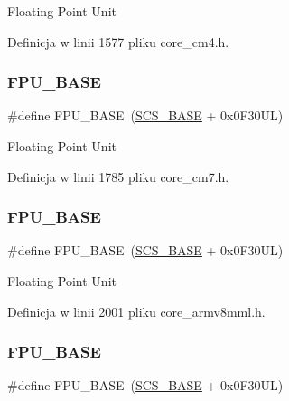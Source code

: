 Floating Point Unit 

Definicja w linii 1577 pliku core\+\_\+cm4.\+h.

\mbox{\label{group___c_m_s_i_s__core__base_ga4dcad4027118c098c07bcd575f1fbb28}} 
\subsubsection{\texorpdfstring{F\+P\+U\+\_\+\+B\+A\+SE}{FPU\_BASE}\hspace{0.1cm}{\footnotesize\ttfamily [2/4]}}
{\footnotesize\ttfamily \#define F\+P\+U\+\_\+\+B\+A\+SE~(\hyperlink{group___c_m_s_i_s__core__base_ga3c14ed93192c8d9143322bbf77ebf770}{S\+C\+S\+\_\+\+B\+A\+SE} +  0x0\+F30\+U\+L)}

Floating Point Unit 

Definicja w linii 1785 pliku core\+\_\+cm7.\+h.

\mbox{\label{group___c_m_s_i_s__core__base_ga4dcad4027118c098c07bcd575f1fbb28}} 
\subsubsection{\texorpdfstring{F\+P\+U\+\_\+\+B\+A\+SE}{FPU\_BASE}\hspace{0.1cm}{\footnotesize\ttfamily [3/4]}}
{\footnotesize\ttfamily \#define F\+P\+U\+\_\+\+B\+A\+SE~(\hyperlink{group___c_m_s_i_s__core__base_ga3c14ed93192c8d9143322bbf77ebf770}{S\+C\+S\+\_\+\+B\+A\+SE} +  0x0\+F30\+U\+L)}

Floating Point Unit 

Definicja w linii 2001 pliku core\+\_\+armv8mml.\+h.

\mbox{\label{group___c_m_s_i_s__core__base_ga4dcad4027118c098c07bcd575f1fbb28}} 
\subsubsection{\texorpdfstring{F\+P\+U\+\_\+\+B\+A\+SE}{FPU\_BASE}\hspace{0.1cm}{\footnotesize\ttfamily [4/4]}}
{\footnotesize\ttfamily \#define F\+P\+U\+\_\+\+B\+A\+SE~(\hyperlink{group___c_m_s_i_s__core__base_ga3c14ed93192c8d9143322bbf77ebf770}{S\+C\+S\+\_\+\+B\+A\+SE} +  0x0\+F30\+U\+L)}


